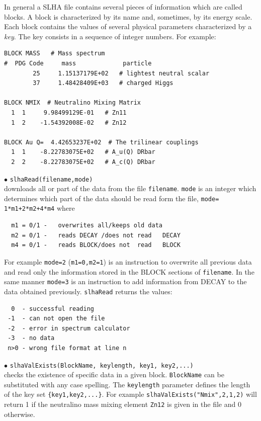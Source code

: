 \documentclass[12pt,a4paper]{article}
\begin{document}
In general a SLHA file contains several pieces of information 
which are called blocks. A block is characterized by its name and,
sometimes, by its energy scale. Each block contains the values of several physical parameters 
characterized by a {\it key}. The  key consists in a sequence of 
integer numbers. For example:
{\small
\begin{verbatim}
BLOCK MASS   # Mass spectrum
#  PDG Code     mass             particle
        25     1.15137179E+02   # lightest neutral scalar
        37     1.48428409E+03   # charged Higgs
  
BLOCK NMIX  # Neutralino Mixing Matrix
  1  1     9.98499129E-01   # Zn11
  1  2    -1.54392008E-02   # Zn12

BLOCK Au Q=  4.42653237E+02  # The trilinear couplings
  1  1    -8.22783075E+02   # A_u(Q) DRbar
  2  2    -8.22783075E+02   # A_c(Q) DRbar
\end{verbatim}
}  

\noindent
$\bullet$ \verb|slhaRead(filename,mode)|\\
downloads all or  part of the data  from the file \verb|filename|.
\verb|mode| is an integer which determines which part of the data should be read form the file, 
\verb|mode= 1*m1+2*m2+4*m4|  where
\begin{verbatim}
  m1 = 0/1 -   overwrites all/keeps old data                                                                                
  m2 = 0/1 -   reads DECAY /does not read   DECAY
  m4 = 0/1 -   reads BLOCK/does not  read   BLOCK
\end{verbatim}
For example \verb|mode=2| (\verb|m1=0,m2=1|) is an instruction to overwrite all previous data and 
read only the information stored in the BLOCK sections of
\verb|filename|. In the same manner \verb|mode=3| is an instruction to add information from DECAY 
to the data obtained previously. \verb|slhaRead| returns the values:
\begin{verbatim}
  0  - successful reading
 -1  - can not open the file
 -2  - error in spectrum calculator
 -3  - no data
 n>0 - wrong file format at line n
\end{verbatim}
%
\noindent
$\bullet$ \verb|slhaValExists(BlockName, keylength, key1, key2,...)|\\
checks the existence of specific data in a given block. 
\verb|BlockName| can  be substituted with any case spelling.
The \verb|keylength| parameter defines the length of the key set
\verb|{key1,key2,...}|. 
For example
     \verb|slhaValExists("Nmix",2,1,2)|
will return 1 if the neutralino mass mixing element \verb|Zn12| is given in the file and 
0 otherwise.
\end{document}
